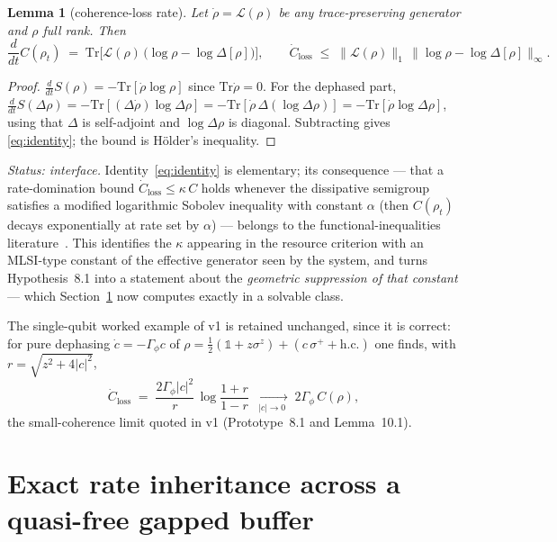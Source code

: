 \documentclass[11pt,a4paper]{article}
\newtheorem{lemma}{Lemma}
\theoremstyle{remark}
\newcommand{\Tr}{\mathrm{Tr}}
\begin{document}
\begin{lemma}[coherence-loss rate]
\label{lem:rate}
Let $\dot\rho = \mathcal L(\rho)$ be any trace-preserving generator and $\rho$ full rank.
Then
\begin{equation}
  \frac{d}{dt} C(\rho_t)
  \;=\; \Tr\!\big[\mathcal L(\rho)\,\big(\log\rho - \log\Delta[\rho]\big)\big],
  \qquad
  \dot C_{\mathrm{loss}} \;\leq\; \big\|\mathcal L(\rho)\big\|_1\,
  \big\|\log\rho - \log\Delta[\rho]\big\|_\infty .
  \label{eq:identity}
\end{equation}
\end{lemma}

\begin{proof}
$\frac{d}{dt}S(\rho) = -\Tr[\dot\rho\log\rho]$ since $\Tr\dot\rho=0$. For the dephased
part, $\frac{d}{dt}S(\Delta\rho) = -\Tr[(\Delta\dot\rho)\log\Delta\rho]
= -\Tr[\dot\rho\,\Delta(\log\Delta\rho)] = -\Tr[\dot\rho\log\Delta\rho]$, using that
$\Delta$ is self-adjoint and $\log\Delta\rho$ is diagonal. Subtracting gives
\eqref{eq:identity}; the bound is H\"older's inequality.
\end{proof}

\emph{Status: interface.} Identity~\eqref{eq:identity} is elementary; its consequence ---
that a rate-domination bound $\dot C_{\mathrm{loss}} \leq \kappa\, C$ holds whenever the
dissipative semigroup satisfies a modified logarithmic Sobolev inequality with constant
$\alpha$ (then $C(\rho_t)$ decays exponentially at rate set by $\alpha$) --- belongs to the
functional-inequalities literature~\cite{KastoryanoTemme2013,CapelRouze2020}. This
identifies the $\kappa$ appearing in the resource criterion with an MLSI-type constant of
the effective generator seen by the system, and turns Hypothesis~8.1 into a statement
about the \emph{geometric suppression of that constant} --- which Section~\ref{sec:exact}
now computes exactly in a solvable class.

The single-qubit worked example of v1 is retained unchanged, since it is correct: for pure
dephasing $\dot c = -\Gamma_\phi c$ of $\rho = \frac12(\mathbb 1 + z\sigma^z) +
(c\,\sigma^+ + \mathrm{h.c.})$ one finds, with $r=\sqrt{z^2+4|c|^2}$,
\begin{equation}
  \dot C_{\mathrm{loss}} \;=\; \frac{2\Gamma_\phi |c|^2}{r}\,
  \log\!\frac{1+r}{1-r}
  \;\xrightarrow[\;|c|\to 0\;]{}\; 2\Gamma_\phi\, C(\rho),
  \label{eq:qubit}
\end{equation}
the small-coherence limit quoted in v1 (Prototype~8.1 and Lemma~10.1).

\section{Exact rate inheritance across a quasi-free gapped buffer}
\label{sec:exact}
\end{document}
